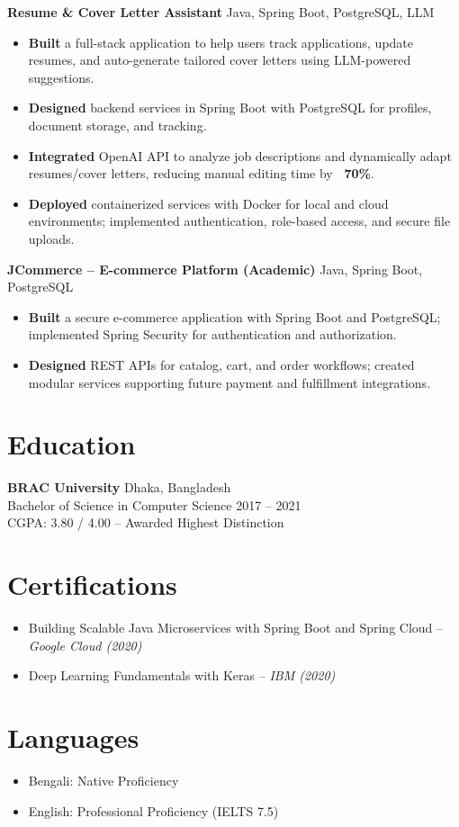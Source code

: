 \documentclass[10pt,a4paper]{article}
\begin{document}
\vspace{8pt}
\noindent
\textbf{Resume \& Cover Letter Assistant} \hfill Java, Spring Boot, PostgreSQL, LLM \\
\begin{itemize}
    \item \textbf{Built} a full-stack application to help users track applications, update resumes, and auto-generate tailored cover letters using LLM-powered suggestions.
    \item \textbf{Designed} backend services in Spring Boot with PostgreSQL for profiles, document storage, and tracking.
    \item \textbf{Integrated} OpenAI API to analyze job descriptions and dynamically adapt resumes/cover letters, reducing manual editing time by \textbf{~70\%}.
    \item \textbf{Deployed} containerized services with Docker for local and cloud environments; implemented authentication, role-based access, and secure file uploads.
\end{itemize}

\vspace{8pt}
\noindent
\textbf{JCommerce – E-commerce Platform (Academic)} \hfill Java, Spring Boot, PostgreSQL \\
\begin{itemize}
    \item \textbf{Built} a secure e-commerce application with Spring Boot and PostgreSQL; implemented Spring Security for authentication and authorization.
    \item \textbf{Designed} REST APIs for catalog, cart, and order workflows; created modular services supporting future payment and fulfillment integrations.
\end{itemize}

\section*{Education}
\textbf{BRAC University} \hfill Dhaka, Bangladesh \\
Bachelor of Science in Computer Science \hfill 2017 -- 2021 \\
CGPA: 3.80 / 4.00 -- Awarded Highest Distinction

\section*{Certifications}
\begin{itemize}
    \item Building Scalable Java Microservices with Spring Boot and Spring Cloud -- \textit{Google Cloud (2020)}
    \item Deep Learning Fundamentals with Keras -- \textit{IBM (2020)}
\end{itemize}

\section*{Languages}
\begin{itemize}
    \item Bengali: Native Proficiency
    \item English: Professional Proficiency (IELTS 7.5)
\end{itemize}
\end{document}
